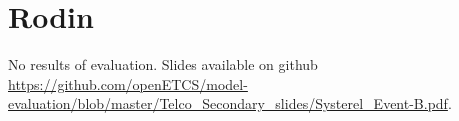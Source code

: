 \chapter{Rodin}
\label{sec:rodin}

No results of evaluation.
Slides available on github \url{https://github.com/openETCS/model-evaluation/blob/master/Telco_Secondary_slides/Systerel_Event-B.pdf}.

